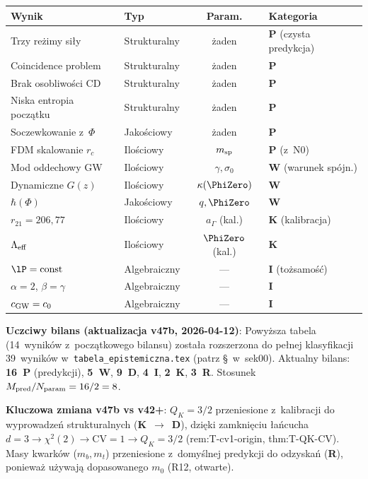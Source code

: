 \begin{remark}
\medskip
\begin{center}\small
\begin{tabular}{@{}llcl@{}}
\toprule
\textbf{Wynik} & \textbf{Typ} & \textbf{Param.} & \textbf{Kategoria} \\
\midrule
Trzy re\.zimy si\l{}y    & Strukturalny & \.zaden & \textbf{P} (czysta predykcja) \\
Coincidence problem     & Strukturalny & \.zaden & \textbf{P} \\
Brak osobliwo\'sci CD   & Strukturalny & \.zaden & \textbf{P} \\
Niska entropia pocz\k{a}tku & Strukturalny & \.zaden & \textbf{P} \\
Soczewkowanie z~$\Phi$  & Jako\'sciowy  & \.zaden & \textbf{P} \\
FDM skalowanie $r_c$    & Ilo\'sciowy   & $m_{\rm sp}$  & \textbf{P} (z~N0) \\
\midrule
Mod oddechowy GW        & Ilo\'sciowy   & $\gamma, \sigma_0$ & \textbf{W} (warunek sp\'ojn.) \\
Dynamiczne $G(z)$       & Ilo\'sciowy   & $\kappa(\PhiZero)$ & \textbf{W} \\
$\hbar(\Phi)$           & Jako\'sciowy  & $q, \PhiZero$      & \textbf{W} \\
$r_{21} = 206{,}77$     & Ilo\'sciowy   & $a_\Gamma$ (kal.) & \textbf{K} (kalibracja) \\
$\Lambda_{\rm eff}$     & Ilo\'sciowy   & $\PhiZero$ (kal.) & \textbf{K} \\
\midrule
$\lP = \mathrm{const}$    & Algebraiczny & --- & \textbf{I} (to\.zsamo\'s\'c) \\
$\alpha = 2$, $\beta=\gamma$ & Algebraiczny & --- & \textbf{I} \\
$c_{\rm GW} = c_0$        & Algebraiczny & --- & \textbf{I} \\
\bottomrule
\end{tabular}
\end{center}

\noindent\textbf{Uczciwy bilans (aktualizacja v47b, 2026-04-12)}:
Powy\.zsza tabela (14~wynik\'ow z~pocz\k{a}tkowego bilansu)
zosta\l{}a rozszerzona do pe\l{}nej klasyfikacji 39~wynik\'ow
w~\texttt{tabela\_epistemiczna.tex}
(patrz \S\, w~sek00).
Aktualny bilans:
\textbf{16~P} (predykcji), \textbf{5~W}, \textbf{9~D},
\textbf{4~I}, \textbf{2~K}, \textbf{3~R}.
Stosunek $M_{\rm pred}/N_{\rm param} = 16/2 = 8$.

\medskip\noindent
\textbf{Kluczowa zmiana v47b vs v42+}:
$Q_K = 3/2$ przeniesione z~kalibracji do wyprowadze\'n
strukturalnych (\textbf{K}~$\to$~\textbf{D}),
dzi\k{e}ki zamkni\k{e}ciu \l{}a\'ncucha
$d{=}3 \to \chi^2(2) \to \mathrm{CV}{=}1 \to Q_K{=}3/2$
(rem:T-cv1-origin, thm:T-QK-CV).
Masy kwark\'ow ($m_b, m_t$) przeniesione z~domy\'slnej
predykcji do odzyska\'n (\textbf{R}), poniewa\.z u\.zywaj\k{a}
dopasowanego $m_0$ (R12, otwarte).


\end{remark}
